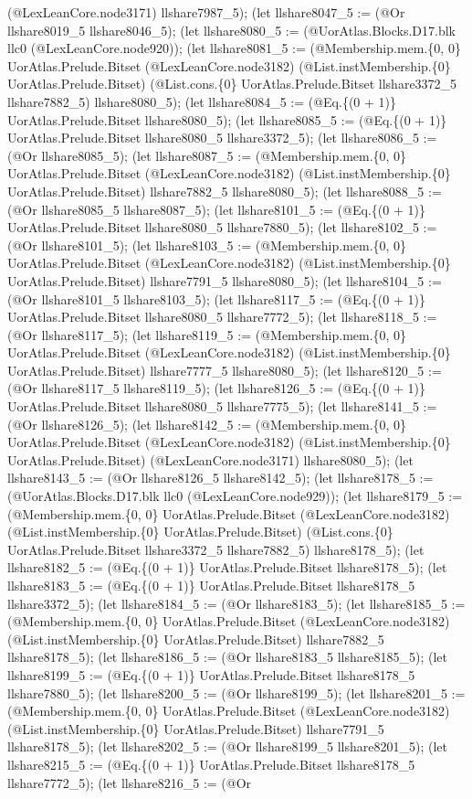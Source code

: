 \documentclass[11pt]{article}
\begin{document}
(@LexLeanCore.node3171) llshare7987\_5); (let llshare8047\_5 := (@Or llshare8019\_5 llshare8046\_5); (let llshare8080\_5 := (@UorAtlas.Blocks.D17.blk llc0 (@LexLeanCore.node920)); (let llshare8081\_5 := (@Membership.mem.\{0, 0\} UorAtlas.Prelude.Bitset (@LexLeanCore.node3182) (@List.instMembership.\{0\} UorAtlas.Prelude.Bitset) (@List.cons.\{0\} UorAtlas.Prelude.Bitset llshare3372\_5 llshare7882\_5) llshare8080\_5); (let llshare8084\_5 := (@Eq.\{(0 + 1)\} UorAtlas.Prelude.Bitset llshare8080\_5); (let llshare8085\_5 := (@Eq.\{(0 + 1)\} UorAtlas.Prelude.Bitset llshare8080\_5 llshare3372\_5); (let llshare8086\_5 := (@Or llshare8085\_5); (let llshare8087\_5 := (@Membership.mem.\{0, 0\} UorAtlas.Prelude.Bitset (@LexLeanCore.node3182) (@List.instMembership.\{0\} UorAtlas.Prelude.Bitset) llshare7882\_5 llshare8080\_5); (let llshare8088\_5 := (@Or llshare8085\_5 llshare8087\_5); (let llshare8101\_5 := (@Eq.\{(0 + 1)\} UorAtlas.Prelude.Bitset llshare8080\_5 llshare7880\_5); (let llshare8102\_5 := (@Or llshare8101\_5); (let llshare8103\_5 := (@Membership.mem.\{0, 0\} UorAtlas.Prelude.Bitset (@LexLeanCore.node3182) (@List.instMembership.\{0\} UorAtlas.Prelude.Bitset) llshare7791\_5 llshare8080\_5); (let llshare8104\_5 := (@Or llshare8101\_5 llshare8103\_5); (let llshare8117\_5 := (@Eq.\{(0 + 1)\} UorAtlas.Prelude.Bitset llshare8080\_5 llshare7772\_5); (let llshare8118\_5 := (@Or llshare8117\_5); (let llshare8119\_5 := (@Membership.mem.\{0, 0\} UorAtlas.Prelude.Bitset (@LexLeanCore.node3182) (@List.instMembership.\{0\} UorAtlas.Prelude.Bitset) llshare7777\_5 llshare8080\_5); (let llshare8120\_5 := (@Or llshare8117\_5 llshare8119\_5); (let llshare8126\_5 := (@Eq.\{(0 + 1)\} UorAtlas.Prelude.Bitset llshare8080\_5 llshare7775\_5); (let llshare8141\_5 := (@Or llshare8126\_5); (let llshare8142\_5 := (@Membership.mem.\{0, 0\} UorAtlas.Prelude.Bitset (@LexLeanCore.node3182) (@List.instMembership.\{0\} UorAtlas.Prelude.Bitset) (@LexLeanCore.node3171) llshare8080\_5); (let llshare8143\_5 := (@Or llshare8126\_5 llshare8142\_5); (let llshare8178\_5 := (@UorAtlas.Blocks.D17.blk llc0 (@LexLeanCore.node929)); (let llshare8179\_5 := (@Membership.mem.\{0, 0\} UorAtlas.Prelude.Bitset (@LexLeanCore.node3182) (@List.instMembership.\{0\} UorAtlas.Prelude.Bitset) (@List.cons.\{0\} UorAtlas.Prelude.Bitset llshare3372\_5 llshare7882\_5) llshare8178\_5); (let llshare8182\_5 := (@Eq.\{(0 + 1)\} UorAtlas.Prelude.Bitset llshare8178\_5); (let llshare8183\_5 := (@Eq.\{(0 + 1)\} UorAtlas.Prelude.Bitset llshare8178\_5 llshare3372\_5); (let llshare8184\_5 := (@Or llshare8183\_5); (let llshare8185\_5 := (@Membership.mem.\{0, 0\} UorAtlas.Prelude.Bitset (@LexLeanCore.node3182) (@List.instMembership.\{0\} UorAtlas.Prelude.Bitset) llshare7882\_5 llshare8178\_5); (let llshare8186\_5 := (@Or llshare8183\_5 llshare8185\_5); (let llshare8199\_5 := (@Eq.\{(0 + 1)\} UorAtlas.Prelude.Bitset llshare8178\_5 llshare7880\_5); (let llshare8200\_5 := (@Or llshare8199\_5); (let llshare8201\_5 := (@Membership.mem.\{0, 0\} UorAtlas.Prelude.Bitset (@LexLeanCore.node3182) (@List.instMembership.\{0\} UorAtlas.Prelude.Bitset) llshare7791\_5 llshare8178\_5); (let llshare8202\_5 := (@Or llshare8199\_5 llshare8201\_5); (let llshare8215\_5 := (@Eq.\{(0 + 1)\} UorAtlas.Prelude.Bitset llshare8178\_5 llshare7772\_5); (let llshare8216\_5 := (@Or 
\end{document}
